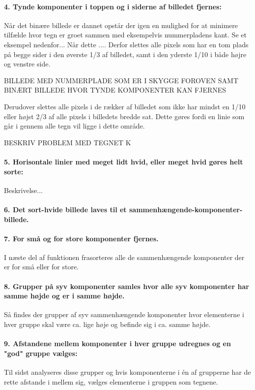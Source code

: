 \paragraph{4. Tynde komponenter i toppen og i siderne af billedet fjernes:}
Når det binære billede er dannet opstår der igen en mulighed for at minimere tilfælde hvor tegn er groet sammen med eksempelvis nummerpladens kant. Se et eksempel nedenfor... Når dette .... Derfor slettes alle pixels som har en tom plads på begge sider i den øverste 1/3 af billedet, samt i den yderste 1/10 i både højre og venstre side.

BILLEDE MED NUMMERPLADE SOM ER I SKYGGE FOROVEN SAMT BINÆRT BILLEDE HVOR TYNDE KOMPONENTER KAN FJERNES

Derudover slettes alle pixels i de rækker af billedet som ikke har mindst en 1/10 eller højst 2/3 af alle pixels i billedets bredde sat. Dette gøres fordi en linie som går i gennem alle tegn vil ligge i dette område.

BESKRIV PROBLEM MED TEGNET K

\paragraph{5. Horisontale linier med meget lidt hvid, eller meget hvid gøres helt sorte:}
Beskrivelse...

\paragraph{6. Det sort-hvide billede laves til et sammenhængende-komponenter-billede.}
\paragraph{7. For små og for store komponenter fjernes.}
I næste del af funktionen frasorteres alle de sammenhængende komponenter der er for små eller for store.

\paragraph{8. Grupper på syv komponenter samles hvor alle syv komponenter har samme højde og er i samme højde.}

Så findes der grupper af syv sammenhængende komponenter hvor elementerne i hver gruppe skal være ca. lige høje og befinde sig i ca. samme højde.

\paragraph{9. Afstandene mellem komponenter i hver gruppe udregnes og en "god" gruppe vælges:}
Til sidst analyseres disse grupper og hvis komponenterne i én af grupperne har de rette afstande i mellem sig, vælges elementerne i gruppen som tegnene.

